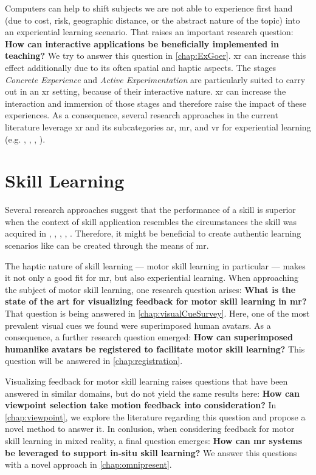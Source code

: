 Computers can help to shift subjects we are not able to experience first hand (due to cost, risk, geographic distance, or the abstract nature of the topic) into an experiential learning scenario. That raises an important research question: \textbf{How can interactive applications be beneficially implemented in teaching?} We try to answer this question in \autoref{chap:ExGoer}. \Acrfull{xr} can increase this effect additionally due to its often spatial and haptic aspects.
The stages \emph{Concrete Experience} and \emph{Active Experimentation} are particularly suited to carry out in an \acrshort{xr} setting, because of their interactive nature. \acrshort{xr} can increase the interaction and immersion of those stages and therefore raise the impact of these experiences.
As a consequence, several research approaches in the current literature leverage \acrshort{xr} and its subcategories \acrshort{ar}, \acrshort{mr}, and \acrshort{vr} for experiential learning (e.g. \cite{asad2021virtual}, \cite{majgaard2020virtual}, \cite{wang2007experiential}, \cite{pueschel:2013:MRCG}).

\section{Skill Learning \label{sec:skill}}
Several research approaches suggest that the performance of a skill is superior when the context of skill application resembles the circumstances the skill was acquired in \cite{godden1975context}, \cite{ruitenberg2012context}, \cite{smith2001environmental}, \cite{anderson1998contextual}, \cite{wright1991contextual}. Therefore, it might be beneficial to create authentic learning scenarios like can be created through the means of \acrshort{mr}.

The haptic nature of skill learning --- motor skill learning in particular --- makes it not only a good fit for \acrshort{mr}, but also experiential learning. When approaching the subject of motor skill learning, one research question arises: \textbf{What is the state of the art for visualizing feedback for motor skill learning in \acrlong{mr}?} That question is being answered in \autoref{chap:visualCueSurvey}. Here, one of the most prevalent visual cues we found were superimposed human avatars. As a consequence, a further research question emerged: \textbf{How can superimposed humanlike avatars be registered to facilitate motor skill learning?} This question will be answered in \autoref{chap:registration}.

Visualizing feedback for motor skill learning raises questions that have been answered in similar domains, but do not yield the same results here: \textbf{How can viewpoint selection take motion feedback into consideration?} In \autoref{chap:viewpoint}, we explore the literature regarding this question and propose a novel method to answer it. In conlusion, when considering feedback for motor skill learning in mixed reality, a final question emerges: \textbf{How can \acrlong{mr} systems be leveraged to support in-situ skill learning?} We answer this questions with a novel approach in \autoref{chap:omnipresent}.


